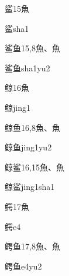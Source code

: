 \begin{Entry}{鲨}{15}{⿂}
  \begin{Phonetics}{鲨}{sha1}
  \end{Phonetics}
\end{Entry}

\begin{Entry}{鲨鱼}{15,8}{⿂、⿂}
  \begin{Phonetics}{鲨鱼}{sha1yu2}
  \end{Phonetics}
\end{Entry}

\begin{Entry}{鲸}{16}{⿂}
  \begin{Phonetics}{鲸}{jing1}
  \end{Phonetics}
\end{Entry}

\begin{Entry}{鲸鱼}{16,8}{⿂、⿂}
  \begin{Phonetics}{鲸鱼}{jing1yu2}
  \end{Phonetics}
\end{Entry}

\begin{Entry}{鲸鲨}{16,15}{⿂、⿂}
  \begin{Phonetics}{鲸鲨}{jing1sha1}
  \end{Phonetics}
\end{Entry}

\begin{Entry}{鳄}{17}{⿂}
  \begin{Phonetics}{鳄}{e4}
  \end{Phonetics}
\end{Entry}

\begin{Entry}{鳄鱼}{17,8}{⿂、⿂}
  \begin{Phonetics}{鳄鱼}{e4yu2}
  \end{Phonetics}
\end{Entry}


